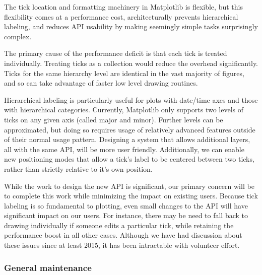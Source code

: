\documentclass[12pt]{article}
\numberwithin{page}{section}
\begin{document}
The tick location and formatting machinery in Matplotlib is flexible, but this
flexibility comes at a performance cost, architecturally prevents hierarchical labeling,
and reduces API usability by making seemingly simple tasks surprisingly complex.

The primary cause of the performance deficit is that each tick is treated individually.
Treating ticks as a collection would reduce the overhead significantly.
Ticks for the same hierarchy level are identical in the vast majority of figures, and so
can take advantage of faster low level drawing routines.

Hierarchical labeling is particularly useful for plots with date/time axes and those with
hierarchical categories.
Currently, Matplotlib only supports two levels of ticks on any given axis (called major
and minor).
Further levels can be approximated, but doing so requires usage of relatively advanced
features outside of their normal usage pattern.
Designing a system that allows additional layers, all with the same API, will be more
user friendly.
Additionally, we can enable new positioning modes that allow a tick's label to be
centered between two ticks, rather than strictly relative to it's own position.

While the work to design the new API is significant, our primary concern will be to
complete this work while minimizing the impact on existing users.
Because tick labeling is so fundamental to plotting, even small changes to the API will
have significant impact on our users.
For instance, there may be need to fall back to drawing individually if someone edits a
particular tick, while retaining the performance boost in all other cases.
Although we have had discussion about these issues since at least 2015, it has been
intractable with volunteer effort.


\subsubsection{General maintenance}
\end{document}
